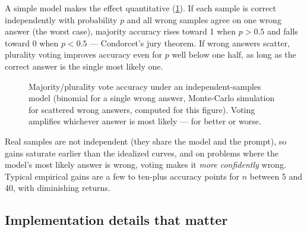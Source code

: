 A simple model makes the effect quantitative (\cref{fig:scaling:condorcet}). If each sample is
correct independently with probability $p$ and all wrong samples agree on one wrong answer (the
worst case), majority accuracy rises toward 1 when $p > 0.5$ and falls toward 0 when $p < 0.5$ ---
Condorcet's jury theorem. If wrong answers scatter, plurality voting improves accuracy even for
$p$ well below one half, as long as the correct answer is the single most likely one.

\begin{figure}[t]
\centering
{}
\caption{Majority/plurality vote accuracy under an independent-samples model (binomial for a single
wrong answer, Monte-Carlo simulation for scattered wrong answers, computed for this figure). Voting
amplifies whichever answer is most likely --- for better or worse.}
\label{fig:scaling:condorcet}
\end{figure}

Real samples are not independent (they share the model and the prompt), so gains saturate earlier
than the idealized curves, and on problems where the model's most likely answer is wrong, voting
makes it \emph{more confidently} wrong. Typical empirical gains are a few to ten-plus accuracy
points for $n$ between 5 and 40, with diminishing returns.

\subsection{Implementation details that matter}
